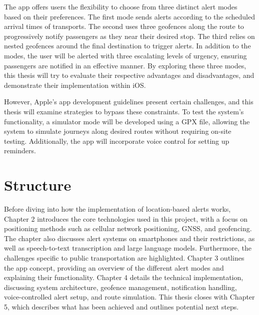 The app offers users the flexibility to choose from three distinct alert modes based on their preferences. The first mode sends alerts according to the scheduled arrival times of transports. The second uses three geofences along the route to progressively notify passengers as they near their desired stop. The third relies on nested geofences around the final destination to trigger alerts. In addition to the modes, the user will be alerted with three escalating levels of urgency, ensuring passengers are notified in an effective manner. By exploring these three modes, this thesis will try to evaluate their respective advantages and disadvantages, and demonstrate their implementation within iOS. 

However, Apple's app development guidelines present certain challenges, and this thesis will examine strategies to bypass these constraints. To test the system's functionality, a simulator mode will be developed using a GPX file, allowing the system to simulate journeys along desired routes without requiring on-site testing. Additionally, the app will incorporate voice control for setting up reminders.

\section{Structure}
Before diving into how the implementation of location-based alerts works, Chapter 2 introduces the core technologies used in this project, with a focus on positioning methods such as cellular network positioning, GNSS, and geofencing. The chapter also discusses alert systems on smartphones and their restrictions, as well as speech-to-text transcription and large language models. Furthermore, the challenges specific to public transportation are highlighted. Chapter 3 outlines the app concept, providing an overview of the different alert modes and explaining their functionality. Chapter 4 details the technical implementation, discussing system architecture, geofence management, notification handling, voice-controlled alert setup, and route simulation. This thesis closes with Chapter 5, which describes what has been achieved and outlines potential next steps.